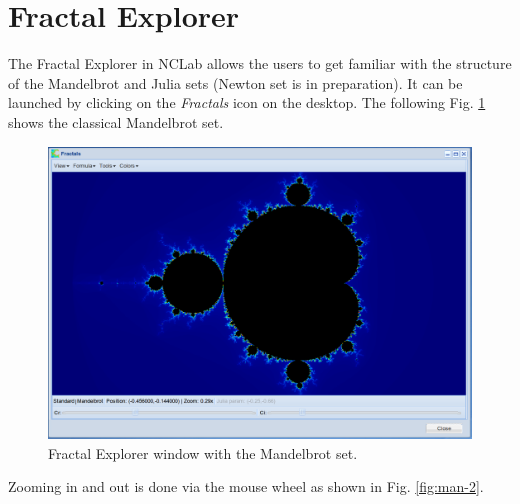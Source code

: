 \documentclass{article}
\begin{document}

\section{Fractal Explorer}

The Fractal Explorer in NCLab allows the users to get familiar with the structure of the Mandelbrot
and Julia sets (Newton set is in preparation). It can be launched by clicking on the 
{\em Fractals} icon on the desktop. The following Fig. \ref{fig:man-1} shows the classical 
Mandelbrot set.\\

\clearpage
\begin{figure}[!ht]
\begin{center}
\includegraphics[width=\textwidth]{img/mandelbrot-1.png}
\end{center}
\caption{Fractal Explorer window with the Mandelbrot set.}
\label{fig:man-1}
\end{figure}

Zooming in and out is done via the mouse wheel as shown in Fig. \ref{fig:man-2}.

\clearpage
\end{document}
